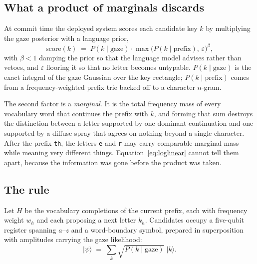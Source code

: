 \documentclass[conference]{IEEEtran}
\begin{document}
\subsection{What a product of marginals discards}

At commit time the deployed system scores each candidate key $k$ by multiplying
the gaze posterior with a language prior,
\begin{equation}
\mathrm{score}(k) \;=\; P(k \mid \text{gaze}) \cdot
  \max\!\big(P(k \mid \text{prefix}),\, \varepsilon\big)^{\beta},
\label{eq:loglinear}
\end{equation}
with $\beta < 1$ damping the prior so that the language model advises rather
than vetoes, and $\varepsilon$ flooring it so that no letter becomes untypable.
$P(k \mid \text{gaze})$ is the exact integral of the gaze Gaussian over the key
rectangle; $P(k \mid \text{prefix})$ comes from a frequency-weighted prefix trie
backed off to a character $n$-gram.

The second factor is a \emph{marginal}. It is the total frequency mass of every
vocabulary word that continues the prefix with $k$, and forming that sum
destroys the distinction between a letter supported by one dominant continuation
and one supported by a diffuse spray that agrees on nothing beyond a single
character. After the prefix \texttt{th}, the letters \texttt{e} and \texttt{r}
may carry comparable marginal mass while meaning very different things.
Equation~\eqref{eq:loglinear} cannot tell them apart, because the information
was gone before the product was taken.

\subsection{The rule}

Let $H$ be the vocabulary completions of the current prefix, each with frequency
weight $w_h$ and each proposing a next letter $k_h$. Candidates occupy a
five-qubit register spanning $a$--$z$ and a word-boundary symbol, prepared in
superposition with amplitudes carrying the gaze likelihood:
\begin{equation}
\lvert \psi \rangle \;=\; \sum_{k} \sqrt{P(k \mid \text{gaze})}\; \lvert k \rangle .
\end{equation}
\end{document}

